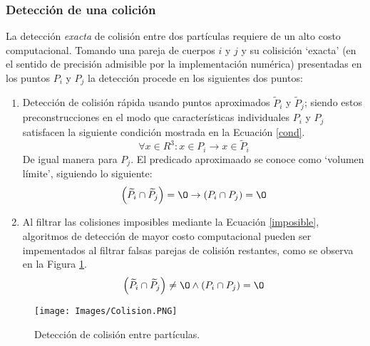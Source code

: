 \subsubsection{Detecci\'on de una colici\'on} \label{detect}

\noindent
\justify

La detecci\'on \textit{exacta} de colisi\'on entre dos part\'iculas requiere de un alto costo computacional. Tomando una pareja de cuerpos $i$ y $j$ y su colisici\'on `exacta' (en el sentido de precisi\'on admisible por la implementaci\'on num\'erica) presentadas en los puntos $P_i$ y $P_j$ la detecci\'on procede en los siguientes dos puntos:

\begin{enumerate}
	\item Detecci\'on de colisi\'on r\'apida usando puntos aproximados $\widetilde{P}_i$ y $\widetilde{P}_j$; siendo estos preconstrucciones en el modo que caracter\'isticas individuales $P_i$ y $P_j$ satisfacen la siguiente condici\'on mostrada en la Ecuaci\'on \ref{cond}.
	\begin{equation}
		\forall x \in R^3 : x \in P_i \rightarrow x \in \widetilde{P}_i
		\label{cond}
	\end{equation}
	De igual manera para $P_j$. El predicado aproximaado se conoce como `volumen l\'imite', siguiendo lo siguiente:
	\begin{equation}
		\left(\widetilde{P}_i \cap \widetilde{P}_j \right) = {\O} \rightarrow \left( P_i \cap P_j \right) = {\O}
		\label{imposible}
	\end{equation}
	\item Al filtrar las colisiones imposibles mediante la Ecuaci\'on \ref{imposible}, algoritmos de detecci\'on de mayor costo computacional pueden ser impementados al filtrar falsas parejas de colisi\'on restantes, como se observa en la Figura \ref{colision}.
	\begin{equation}
		\left(\widetilde{P}_i \cap \widetilde{P}_j \right) \neq {\O} \wedge \left(P_i \cap P_j \right) = {\O}
	\end{equation}
\end{enumerate}

\begin{figure}[h!]
\centering
\texttt{[image: Images/Colision.PNG]}
\caption{Detecci\'on de colisi\'on entre part\'iculas.}
\label{colision}
\end{figure}